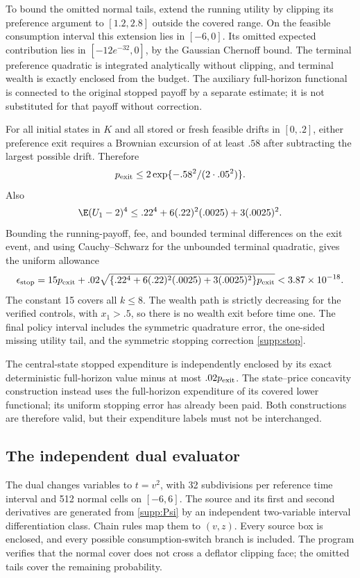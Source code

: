 To bound the omitted normal tails, extend the running utility by clipping its preference argument to $[1.2,2.8]$ outside the covered range. On the feasible consumption interval this extension lies in $[-6,0]$. Its omitted expected contribution lies in $[-12e^{-32},0]$, by the Gaussian Chernoff bound. The terminal preference quadratic is integrated analytically without clipping, and terminal wealth is exactly enclosed from the budget. The auxiliary full-horizon functional is connected to the original stopped payoff by a separate estimate; it is not substituted for that payoff without correction.

For all initial states in $K$ and all stored or fresh feasible drifts in $[0,.2]$, either preference exit requires a Brownian excursion of at least $.58$ after subtracting the largest possible drift. Therefore
\[
 p_{\rm exit}\leq2\exp\{- .58^2/(2\cdot .05^2)\}.
\]
Also
\[
 \E(U_1-2)^4\leq .22^4+6(.22)^2(.0025)+3(.0025)^2.
\]
Bounding the running-payoff, fee, and bounded terminal differences on the exit event, and using Cauchy--Schwarz for the unbounded terminal quadratic, gives the uniform allowance
\begin{equation}
 \epsilon_{\rm stop}=15p_{\rm exit}
   +.02\sqrt{\{.22^4+6(.22)^2(.0025)+3(.0025)^2\}p_{\rm exit}}
   <3.87\times10^{-18}.\label{supp:stop}
\end{equation}
The constant 15 covers all $k\leq8$. The wealth path is strictly decreasing for the verified controls, with $x_1>.5$, so there is no wealth exit before time one. The final policy interval includes the symmetric quadrature error, the one-sided missing utility tail, and the symmetric stopping correction \eqref{supp:stop}.

The central-state stopped expenditure is independently enclosed by its exact deterministic full-horizon value minus at most $.02p_{\rm exit}$. The state--price concavity construction instead uses the full-horizon expenditure of its covered lower functional; its uniform stopping error has already been paid. Both constructions are therefore valid, but their expenditure labels must not be interchanged.

\subsection{The independent dual evaluator}
The dual changes variables to $t=v^2$, with 32 subdivisions per reference time interval and 512 normal cells on $[-6,6]$. The source and its first and second derivatives are generated from \eqref{supp:Psi} by an independent two-variable interval differentiation class. Chain rules map them to $(v,z)$. Every source box is enclosed, and every possible consumption-switch branch is included. The program verifies that the normal cover does not cross a deflator clipping face; the omitted tails cover the remaining probability.

